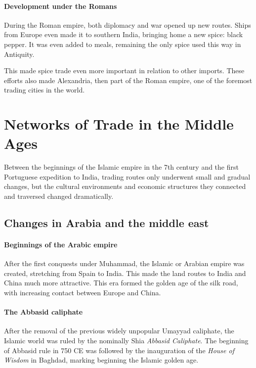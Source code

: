 \documentclass[11pt, a4paper, headings=standardclasses]{scrartcl}
\begin{document}
\paragraph{Development under the Romans}

During the Roman empire, both diplomacy and war opened up new routes. Ships from Europe even made it to southern India, bringing home a new spice: black pepper. It was even added to meals, remaining the only spice used this way in Antiquity.\autocite{RIS}

This made spice trade even more important in relation to other imports.\autocite{SilkRome, Rome} These efforts also made Alexandria, then part of the Roman empire, one of the foremost trading cities in the world.\autocite{SpiceTrade}
\section{Networks of Trade in the Middle Ages}

Between the beginnings of the Islamic empire in the 7th century and the first Portuguese expedition to India, trading routes only underwent small and gradual changes, but the cultural environments and economic structures they connected and traversed changed dramatically.

\subsection{Changes in Arabia and the middle east}

\paragraph{Beginnings of the Arabic empire}
After the first conquests under Muhammad, the Islamic or Arabian empire was created, stretching from Spain to India\autocite[Section \textit{Achievements}]{Umayyad}. This made the land routes to India and China much more attractive. This era formed the golden age of the silk road, with increasing contact between Europe and China.

\paragraph{The Abbasid caliphate}

After the removal of the previous widely unpopular\autocite{Umayyad} Umayyad caliphate, the Islamic world was ruled by the nominally Shia \emph{Abbasid Caliphate}. The beginning of Abbasid rule in 750 CE was followed by the inauguration of the \emph{House of Wisdom} in Baghdad, marking beginning the Islamic golden age.\autocite{Abbasid}
\end{document}

